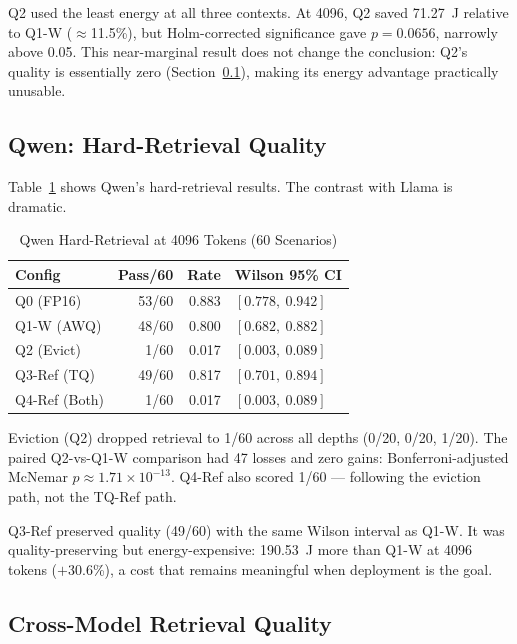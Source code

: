 \documentclass[sigconf,nonacm]{acmart}
\begin{document}
Q2 used the least energy at all three contexts. At 4096, Q2 saved 71.27~J
relative to Q1-W ($\approx$11.5\%), but Holm-corrected significance gave
$p = 0.0656$, narrowly above 0.05. This near-marginal result does not change the
conclusion: Q2's quality is essentially zero (Section~\ref{sec:qwen-quality}),
making its energy advantage practically unusable.

\subsection{Qwen: Hard-Retrieval Quality}
\label{sec:qwen-quality}

Table~\ref{tab:qwen-quality} shows Qwen's hard-retrieval results. The contrast
with Llama is dramatic.

\begin{table}[htbp]
\caption{Qwen Hard-Retrieval at 4096 Tokens (60 Scenarios)}
\label{tab:qwen-quality}
\centering\small
\begin{tabular}{lrrl}
\toprule
\textbf{Config} & \textbf{Pass/60} & \textbf{Rate} & \textbf{Wilson 95\% CI} \\
\midrule
Q0 (FP16)     & 53/60 & 0.883 & $[0.778,\ 0.942]$ \\
Q1-W (AWQ)    & 48/60 & 0.800 & $[0.682,\ 0.882]$ \\
Q2 (Evict)    & 1/60  & 0.017 & $[0.003,\ 0.089]$ \\
Q3-Ref (TQ)   & 49/60 & 0.817 & $[0.701,\ 0.894]$ \\
Q4-Ref (Both) & 1/60  & 0.017 & $[0.003,\ 0.089]$ \\
\bottomrule
\end{tabular}
\end{table}

Eviction (Q2) dropped retrieval to 1/60 across all depths (0/20, 0/20, 1/20).
The paired Q2-vs-Q1-W comparison had 47 losses and zero gains:
Bonferroni-adjusted McNemar $p \approx 1.71 \times 10^{-13}$. Q4-Ref also scored
1/60 --- following the eviction path, not the TQ-Ref path.

Q3-Ref preserved quality (49/60) with the same Wilson interval as Q1-W. It was
quality-preserving but energy-expensive: 190.53~J more than Q1-W at 4096 tokens
($+$30.6\%), a cost that remains meaningful when deployment is the goal.

\subsection{Cross-Model Retrieval Quality}
\end{document}
